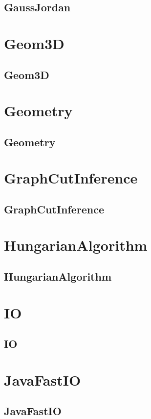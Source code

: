 \documentclass[a4paper, twocolumn]{article}
\begin{document}
\subsection{GaussJordan}

\section{Geom3D}
\subsection{Geom3D}

\section{Geometry}
\subsection{Geometry}

\section{GraphCutInference}
\subsection{GraphCutInference}

\section{HungarianAlgorithm}
\subsection{HungarianAlgorithm}

\section{IO}
\subsection{IO}

\section{JavaFastIO}
\subsection{JavaFastIO}

\end{document}
